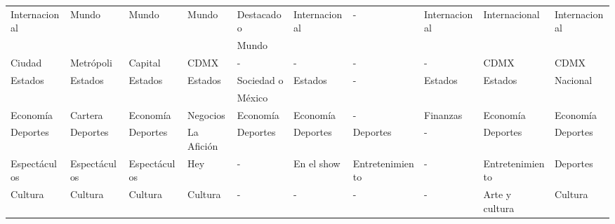 \begin{table}[htbp]
{\begin{tabular}[H]{|l|l|l|l|l|l|l|l|l|l|}
        Internacional & Mundo         & Mundo        & Mundo         & Destacado o       & Internacional & -         & Internacional     & Internacional & Internacional \\ 
        & & & & Mundo & & & & & \\ 
        \hline

        Ciudad        & Metrópoli     & Capital      & CDMX          & -                     & -             & -         & -                 & CDMX          & CDMX      \\ 
        \hline

        Estados       & Estados       & Estados      & Estados       & Sociedad o       & Estados       & -         & Estados           & Estados       & Nacional   \\ 
        & & & & México & & & & & \\ 
        \hline

        Economía      & Cartera       & Economía     & Negocios      & Economía              & Economía      & -         & Finanzas          & Economía      & Economía   \\ 
        \hline

        Deportes      & Deportes      & Deportes     & La Afición    & Deportes              & Deportes      & Deportes  & -                 & Deportes      & Deportes   \\ 
        \hline

        Espectáculos  & Espectáculos  & Espectáculos & Hey           & -                     & En el show    & Entretenimiento & -           & Entretenimiento & Deportes    \\ 
        \hline

        Cultura       & Cultura       & Cultura      & Cultura       & -                     & -             & -         & -                 & Arte y cultura & Cultura   \\ 
        \hline


\end{tabular}}
\end{table}
